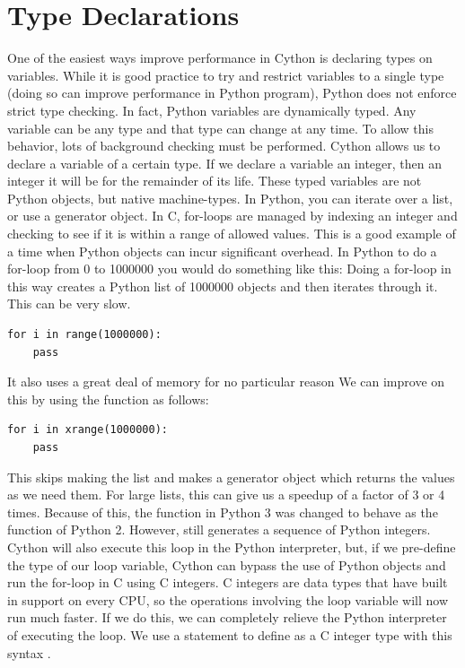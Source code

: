 \section*{Type Declarations}
One of the easiest ways improve performance in Cython is declaring types on variables.
While it is good practice to try and restrict variables to a single type (doing so can improve performance in Python program),
Python does not enforce strict type checking.  In fact, Python variables are dynamically typed.  
Any variable can be any type and that type can change at any time.
To allow this behavior, lots of background checking must be performed.
Cython allows us to declare a variable of a certain type.  If we declare a variable an integer, then an integer it will be for the remainder of its life.
These typed variables are not Python objects, but native machine-types.
In Python, you can iterate over a list, or use a generator object.
In C, for-loops are managed by indexing an integer and checking to see if it is within a range of allowed values.
This is a good example of a time when Python objects can incur significant overhead.
In Python to do a for-loop from 0 to 1000000 you would do something like this:
Doing a for-loop in this way creates a Python list of 1000000 objects and then iterates through it.
This can  be very slow.
\begin{lstlisting}
for i in range(1000000):
    pass
\end{lstlisting}
It also uses a great deal of memory for no particular reason
We can improve on this by using the  function as follows:
\begin{lstlisting}
for i in xrange(1000000):
    pass
\end{lstlisting}
This skips making the list and makes a generator object which returns the values as we need them.
For large lists, this can give us a speedup of a factor of 3 or 4 times.
Because of this, the  function in Python 3 was changed to behave as the  function of Python 2.
However,  still generates a sequence of Python integers.
Cython will also execute this loop in the Python interpreter, but, if we pre-define the type of our loop variable, Cython can bypass the use of Python objects and run the for-loop in C using C integers.
C integers are data types that have built in support on every CPU, so the operations involving the loop variable will now run much faster.
If we do this, we can completely relieve the Python interpreter of executing the loop.
We use a  statement to define  as a C integer type with this syntax .
